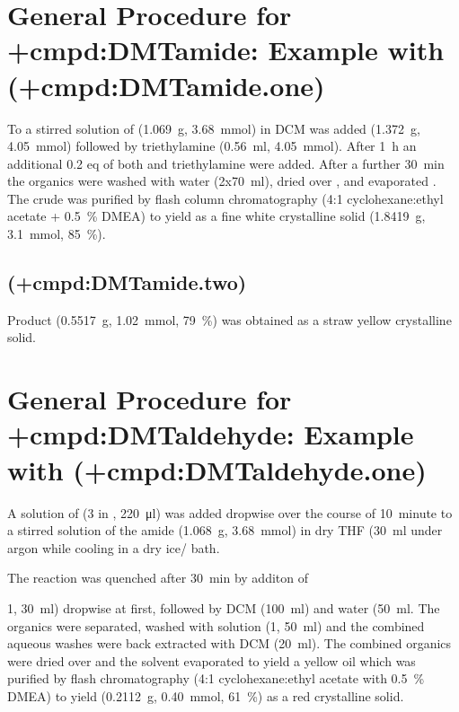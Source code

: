 {\section{General Procedure for \cmpd+{cmpd:DMTamide}: Example with  (\cmpd+{cmpd:DMTamide.one})}

To a stirred solution of  (\SI{1.069}{\gram}, \SI{3.68}{\milli\mol}) in DCM was added  (\SI{1.372}{\gram}, \SI{4.05}{\milli\mol}) followed by triethylamine (\SI{0.56}{\milli\litre}, \SI{4.05}{\milli\mol}). After \SI{1}{\hour} an additional 0.2 eq of both  and triethylamine were added. After a further \SI{30}{\minute} the organics were washed with water (2x\SI{70}{\milli\litre}), dried over , and evaporated \invacuo. The crude was purified by flash column chromatography (4:1 cyclohexane:ethyl acetate + \SI{0.5}{\percent} DMEA) to yield  as a fine white crystalline solid (\SI{1.8419}{\gram}, \SI{3.1}{\milli\mol}, \SI{85}{\percent}).

    \subsection{ (\cmpd+{cmpd:DMTamide.two})}
    Product  (\SI{0.5517}{\gram}, \SI{1.02}{\milli\mol}, \SI{79}{\percent}) was obtained as a straw yellow crystalline solid.


\section{General Procedure for \cmpd+{cmpd:DMTaldehyde}: Example with  (\cmpd+{cmpd:DMTaldehyde.one})}

A solution of  (\SI{3}{\Molar} in , \SI{220}{\micro\litre}) was added dropwise over the course of \SI{10}{minute} to a stirred solution of the amide  (\SI{1.068}{\gram}, \SI{3.68}{\milli\mol}) in dry THF (\SI{30}{\milli\litre} under argon while cooling in a dry ice/ bath.

The reaction was quenched after \SI{30}{\minute} by additon of  {\SI{1}{\Molar}, \SI{30}{\milli\litre}) dropwise at first, followed by DCM (\SI{100}{\milli\litre}) and water (\SI{50}{\milli\litre}. The organics were separated, washed with  solution (\SI{1}{\Molar}, \SI{50}{\milli\litre}) and the combined aqueous washes were back extracted with DCM (\SI{20}{\milli\litre}). The combined organics were dried over  and the solvent evaporated \invacuo to yield a yellow oil which was purified by flash chromatography (4:1 cyclohexane:ethyl acetate with \SI{0.5}{\percent} DMEA) to yield  (\SI{0.2112}{\gram}, \SI{0.40}{\milli\mol}, \SI{61}{\percent}) as a red crystalline solid.

}}

